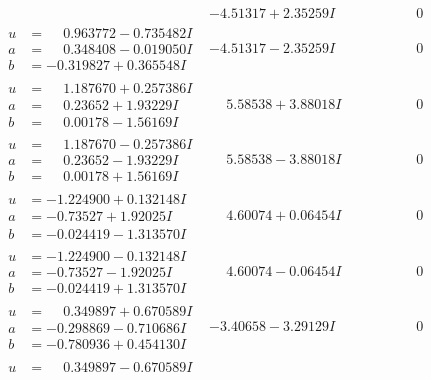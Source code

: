\documentclass[1p]{elsarticle_modified}
\theoremstyle{definition}
\begin{document}
$$\begin{array}{c|c|c}
 & -4.51317 + 2.35259 I & \phantom{-0.000000 } 0 \\ \hline\begin{aligned}
u &= \phantom{-}0.963772 - 0.735482 I \\
a &= \phantom{-}0.348408 - 0.019050 I \\
b &= -0.319827 + 0.365548 I\end{aligned}
 & -4.51317 - 2.35259 I & \phantom{-0.000000 } 0 \\ \hline\begin{aligned}
u &= \phantom{-}1.187670 + 0.257386 I \\
a &= \phantom{-}0.23652 + 1.93229 I \\
b &= \phantom{-}0.00178 - 1.56169 I\end{aligned}
 & \phantom{-}5.58538 + 3.88018 I & \phantom{-0.000000 } 0 \\ \hline\begin{aligned}
u &= \phantom{-}1.187670 - 0.257386 I \\
a &= \phantom{-}0.23652 - 1.93229 I \\
b &= \phantom{-}0.00178 + 1.56169 I\end{aligned}
 & \phantom{-}5.58538 - 3.88018 I & \phantom{-0.000000 } 0 \\ \hline\begin{aligned}
u &= -1.224900 + 0.132148 I \\
a &= -0.73527 + 1.92025 I \\
b &= -0.024419 - 1.313570 I\end{aligned}
 & \phantom{-}4.60074 + 0.06454 I & \phantom{-0.000000 } 0 \\ \hline\begin{aligned}
u &= -1.224900 - 0.132148 I \\
a &= -0.73527 - 1.92025 I \\
b &= -0.024419 + 1.313570 I\end{aligned}
 & \phantom{-}4.60074 - 0.06454 I & \phantom{-0.000000 } 0 \\ \hline\begin{aligned}
u &= \phantom{-}0.349897 + 0.670589 I \\
a &= -0.298869 - 0.710686 I \\
b &= -0.780936 + 0.454130 I\end{aligned}
 & -3.40658 - 3.29129 I & \phantom{-0.000000 } 0 \\ \hline\begin{aligned}
u &= \phantom{-}0.349897 - 0.670589 I \\

\end{aligned}
\end{array}$$
\end{document}

